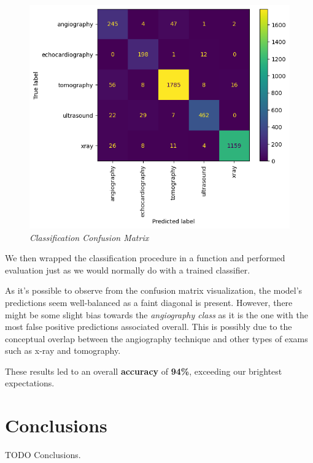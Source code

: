 \documentclass[10pt,twocolumn,letterpaper]{article}
\begin{document}
\begin{figure}[H]
   \centering
   \includegraphics[width=1\linewidth]{img/Classification_Result.png}
   \caption{\textit{Classification Confusion Matrix}}
\end{figure}

We then wrapped the classification procedure in a function and performed evaluation just as we would normally do with a trained classifier.

As it's possible to observe from the confusion matrix visualization, the model's predictions seem well-balanced as a faint diagonal is present.
However, there might be some slight bias towards the \textit{angiography class} as it is the one with the most false positive predictions associated overall.
This is possibly due to the conceptual overlap between the angiography technique and other types of exams such as x-ray and tomography.

These results led to an overall \textbf{accuracy} of \textbf{94\%}, exceeding our brightest expectations.


\section{Conclusions}
TODO Conclusions.\cite{steinhardt, lipton}


{\small


}
\end{document}
